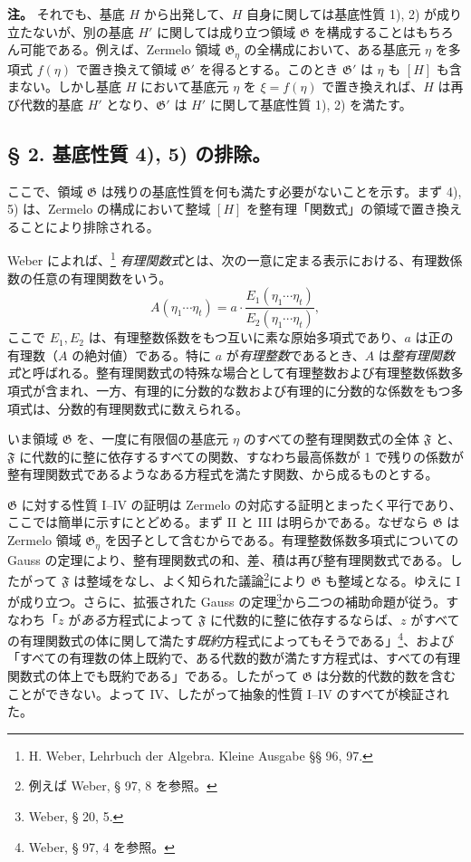 \documentclass[11pt]{article}
\begin{document}
\textbf{注。} それでも、基底 $H$ から出発して、$H$ 自身に関しては基底性質 1), 2) が成り立たないが、別の基底 $H'$ に関しては成り立つ領域 $\mathfrak G$ を構成することはもちろん可能である。例えば、Zermelo 領域 $\mathfrak G_\eta$ の全構成において、ある基底元 $\eta$ を多項式 $f(\eta)$ で置き換えて領域 $\mathfrak G'$ を得るとする。このとき $\mathfrak G'$ は $\eta$ も $[H]$ も含まない。しかし基底 $H$ において基底元 $\eta$ を $\xi=f(\eta)$ で置き換えれば、$H$ は再び代数的基底 $H'$ となり、$\mathfrak G'$ は $H'$ に関して基底性質 1), 2) を満たす。

\subsection*{§ 2. 基底性質 4), 5) の排除。}

ここで、領域 $\mathfrak G$ は残りの基底性質を何も満たす必要がないことを示す。まず 4), 5) は、Zermelo の構成において整域 $[H]$ を整有理「関数式」の領域で置き換えることにより排除される。

Weber によれば、\footnote{H. Weber, Lehrbuch der Algebra. Kleine Ausgabe §§ 96, 97.} \emph{有理関数式}とは、次の一意に定まる表示における、有理数係数の任意の有理関数をいう。
\[
 A(\eta_1\cdots \eta_t)
   = a\cdot\frac{E_1(\eta_1\cdots \eta_t)}{E_2(\eta_1\cdots \eta_t)},
\]
ここで $E_1,E_2$ は、有理整数係数をもつ互いに素な原始多項式であり、$a$ は正の有理数（$A$ の絶対値）である。特に $a$ が\emph{有理整数}であるとき、$A$ は\emph{整有理関数式}と呼ばれる。整有理関数式の特殊な場合として有理整数および有理整数係数多項式が含まれ、一方、有理的に分数的な数および有理的に分数的な係数をもつ多項式は、分数的有理関数式に数えられる。

いま領域 $\mathfrak G$ を、一度に有限個の基底元 $\eta$ のすべての整有理関数式の全体 $\mathfrak F$ と、$\mathfrak F$ に代数的に整に依存するすべての関数、すなわち最高係数が 1 で残りの係数が整有理関数式であるようなある方程式を満たす関数、から成るものとする。

$\mathfrak G$ に対する性質 I--IV の証明は Zermelo の対応する証明とまったく平行であり、ここでは簡単に示すにとどめる。まず II と III は明らかである。なぜなら $\mathfrak G$ は Zermelo 領域 $\mathfrak G_\eta$ を因子として含むからである。有理整数係数多項式についての Gauss の定理により、整有理関数式の和、差、積は再び整有理関数式である。したがって $\mathfrak F$ は整域をなし、よく知られた議論\footnote{例えば Weber, § 97, 8 を参照。}により $\mathfrak G$ も整域となる。ゆえに I が成り立つ。さらに、拡張された Gauss の定理\footnote{Weber, § 20, 5.}から二つの補助命題が従う。すなわち「$z$ が\emph{ある}方程式によって $\mathfrak F$ に代数的に整に依存するならば、$z$ がすべての有理関数式の体に関して満たす\emph{既約}方程式によってもそうである」\footnote{Weber, § 97, 4 を参照。}、および「すべての有理数の体上既約で、ある代数的数が満たす方程式は、すべての有理関数式の体上でも既約である」である。したがって $\mathfrak G$ は分数的代数的数を含むことができない。よって IV、したがって抽象的性質 I--IV のすべてが検証された。
\end{document}
